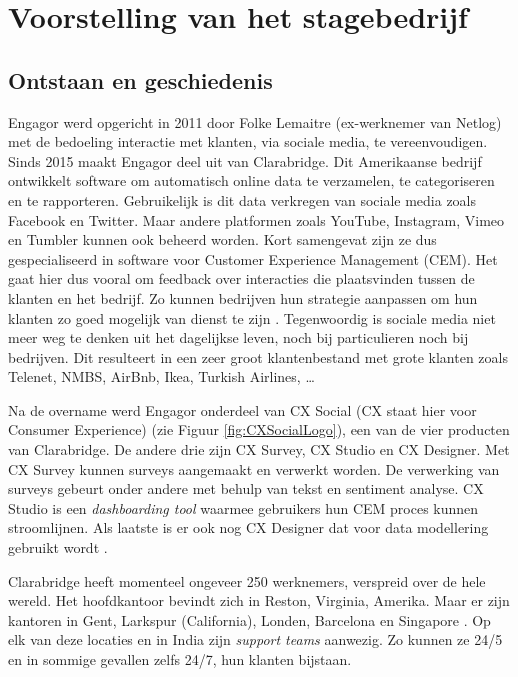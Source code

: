 \chapter{Voorstelling van het stagebedrijf}
\vspace{-3cm}
\section{Ontstaan en geschiedenis}

Engagor werd opgericht in 2011 door Folke Lemaitre (ex-werknemer van Netlog) met de bedoeling interactie met klanten, via sociale media, te vereenvoudigen. Sinds 2015 maakt Engagor deel uit van Clarabridge. Dit Amerikaanse bedrijf ontwikkelt software om automatisch online data te verzamelen, te categoriseren en te rapporteren. Gebruikelijk is dit data verkregen van sociale media zoals Facebook en Twitter. Maar andere platformen zoals YouTube, Instagram, Vimeo en Tumbler kunnen ook beheerd worden. Kort samengevat zijn ze dus gespecialiseerd in software voor Customer Experience Management (CEM). Het gaat hier dus vooral om feedback over interacties die plaatsvinden tussen de klanten en het bedrijf. Zo kunnen bedrijven hun strategie aanpassen om hun klanten zo goed mogelijk van dienst te zijn \cite{bp1}. Tegenwoordig is sociale media niet meer weg te denken uit het dagelijkse leven, noch bij particulieren noch bij bedrijven. Dit resulteert in een zeer groot klantenbestand met grote klanten zoals Telenet, NMBS, AirBnb, Ikea, Turkish Airlines, \ldots 

Na de overname werd Engagor onderdeel van CX Social (CX staat hier voor Consumer Experience) (zie Figuur \ref{fig:CXSocialLogo}), een van de vier producten van Clarabridge. De andere drie zijn CX Survey, CX Studio en CX Designer. Met CX Survey kunnen surveys aangemaakt en verwerkt worden. De verwerking van surveys gebeurt onder andere met behulp van tekst en sentiment analyse. CX Studio is een \textit{dashboarding tool} waarmee gebruikers hun CEM proces kunnen stroomlijnen. Als laatste is er ook nog CX Designer dat voor data modellering gebruikt wordt \cite{Clarabridge.com}. 

Clarabridge heeft momenteel ongeveer 250 werknemers, verspreid over de hele wereld. Het hoofdkantoor bevindt zich in Reston, Virginia, Amerika. Maar er zijn kantoren in Gent, Larkspur (California), Londen, Barcelona en Singapore \cite{ClarabridgeOffices}. Op elk van deze locaties en in India zijn \textit{support teams} aanwezig. Zo kunnen ze 24/5 en in sommige gevallen zelfs 24/7, hun klanten bijstaan.

